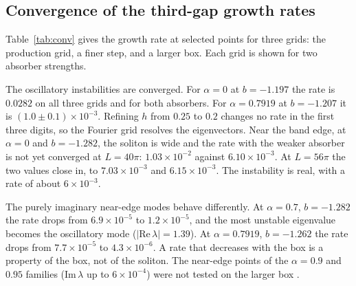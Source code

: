 \documentclass[pra,twocolumn,superscriptaddress,longbibliography]{revtex4-2}
\newif\ifshowtodos
\newcommand{\todo}[1]{\ifshowtodos\textcolor{red}{[TODO: #1]}\fi}
\newcommand{\Img}{\mathrm{Im}\,}
\newcommand{\Rea}{\mathrm{Re}\,}
\begin{document}
\subsection{Convergence of the third-gap growth rates}\label{sec:conv}
Table~\ref{tab:conv} gives the growth rate at selected points for three grids: the production
grid, a finer step, and a larger box. Each grid is shown for two absorber strengths.

The oscillatory instabilities are converged. For $\alpha=0$ at $b=-1.197$ the rate is $0.0282$ on
all three grids and for both absorbers. For $\alpha=0.7919$ at $b=-1.207$ it is
$(1.0\pm0.1)\times10^{-3}$. Refining $h$ from $0.25$ to $0.2$ changes no rate in the first three
digits, so the Fourier grid resolves the eigenvectors. Near the band edge, at $\alpha=0$ and
$b=-1.282$, the soliton is wide and the rate with the weaker absorber is not yet converged at
$L=40\pi$: $1.03\times10^{-2}$ against $6.10\times10^{-3}$. At $L=56\pi$ the two values close in,
to $7.03\times10^{-3}$ and $6.15\times10^{-3}$. The instability is real, with a rate of about
$6\times10^{-3}$.

The purely imaginary near-edge modes behave differently. At $\alpha=0.7$, $b=-1.282$ the rate
drops from $6.9\times10^{-5}$ to $1.2\times10^{-5}$, and the most unstable eigenvalue becomes the
oscillatory mode ($|\Rea\lambda|=1.39$). At $\alpha=0.7919$, $b=-1.262$ the rate drops from
$7.7\times10^{-5}$ to $4.3\times10^{-6}$. A rate that decreases with the box is a property of the
box, not of the soliton. The near-edge points of the $\alpha=0.9$ and $0.95$ families
($\Img\lambda$ up to $6\times10^{-4}$) were not tested on the larger box
\todo{PLAN.md, C2}.

\begin{table}[t]
\caption{\label{tab:conv}Growth rate $\max\Img\lambda$ at selected third-gap points for three grids
(Fourier differentiation), with absorbing layer $g_0=1$ and, in parentheses, $g_0=0.25$. Last
column: $|\Rea\lambda|$ of the most unstable eigenvalue on the largest box (results/convergence.json).}
\footnotesize

\end{table}

\end{document}
